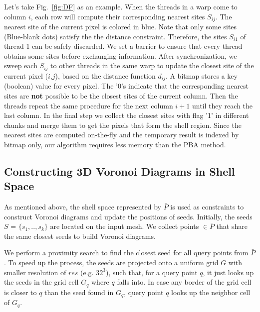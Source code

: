   Let's take Fig.~\ref{fig:DF} as an example.
  When the threads in a warp come to column $i$, each row will compute their corresponding nearest sites $S_{ij}$.
  The nearest site of the current pixel is colored in blue.
  Note that only some sites (Blue-blank dots) satisfy the the distance constraint.
  Therefore, the sites $S_{i1}$ of thread 1 can be safely discarded.
  We set a barrier to ensure that every thread obtains some sites before exchanging information.
  After synchronization, we sweep each $S_{ij}$ to other threads in the same warp to update the closest site of the current pixel ($i$,$j$),
  based on the distance function $d_{ij}$.
  A bitmap stores a key (boolean) value for every pixel.
  The '0's indicate that the corresponding nearest sites are \textbf{not} possible to be the closest sites of the current column.
  Then the threads repeat the same procedure for the next column $i+1$ until they reach the last column.
  In the final step we collect the closest sites with flag '1' in different chunks and merge them to get the pixels that form the shell region.
  Since the nearest sites are computed on-the-fly and the temporary result is indexed by bitmap only,
  our algorithm requires less memory than the PBA method.


\vspace{-0.4cm}

\subsection{Constructing 3D Voronoi Diagrams in Shell Space}
\label{sec:RVD}
  As mentioned above, the shell space represented by $\bar{P}$ is used as constraints to construct Voronoi diagrams and update the positions of seeds.
  Initially, the seeds $S$ = $\{s_1,..,s_k\}$ are located on the input mesh.
  We collect points $\in \bar{P}$ that share the same closest seeds to build Voronoi diagrams.

  We perform a proximity search to find the closest seed for all query points from $\bar{P}$.
  To speed up the process, the seeds are projected onto a uniform grid $G$ with smaller resolution of $res$ (e.g. $32^3$), such that,
  for a query point $q$, it just looks up the seeds in the grid cell $G_q$ where $q$ falls into.
  In case any border of the grid cell is closer to $q$ than the seed found in $G_q$, query point $q$ looks up the neighbor cell of $G_q$.

